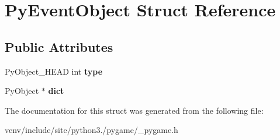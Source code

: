 \hypertarget{struct_py_event_object}{}\section{Py\+Event\+Object Struct Reference}
\label{struct_py_event_object}
\subsection*{Public Attributes}
\begin{DoxyCompactItemize}
\item 
\mbox{\label{struct_py_event_object_af93b1a60c1ff9d2a1b017be9e1434e20}} 
Py\+Object\+\_\+\+H\+E\+AD int {\bfseries type}
\item 
\mbox{\label{struct_py_event_object_ab8f41a1d55afcfab60611516bebd09da}} 
Py\+Object $\ast$ {\bfseries dict}
\end{DoxyCompactItemize}


The documentation for this struct was generated from the following file\+:\begin{DoxyCompactItemize}
\item 
venv/include/site/python3./pygame/\+\_\+pygame.\+h\end{DoxyCompactItemize}
